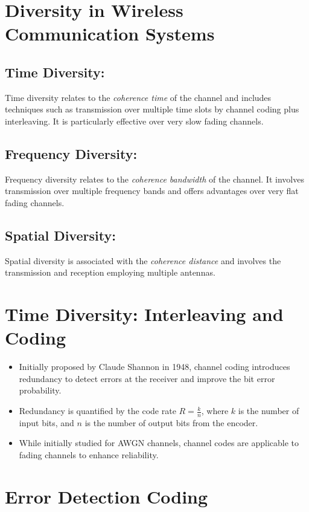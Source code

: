 \section*{Diversity in Wireless Communication Systems}

\subsection*{Time Diversity:}
Time diversity relates to the \textit{coherence time} of the channel and includes techniques such as transmission over multiple time slots by channel coding plus interleaving. It is particularly effective over very slow fading channels.

\subsection*{Frequency Diversity:}
Frequency diversity relates to the \textit{coherence bandwidth} of the channel. It involves transmission over multiple frequency bands and offers advantages over very flat fading channels.

\subsection*{Spatial Diversity:}
Spatial diversity is associated with the \textit{coherence distance} and involves the transmission and reception employing multiple antennas.

\section*{Time Diversity: Interleaving and Coding}
\begin{itemize}
    \item Initially proposed by Claude Shannon in 1948, channel coding introduces redundancy to detect errors at the receiver and improve the bit error probability.
    \item Redundancy is quantified by the code rate $R = \frac{k}{n}$, where $k$ is the number of input bits, and $n$ is the number of output bits from the encoder.
    \item While initially studied for AWGN channels, channel codes are applicable to fading channels to enhance reliability.
\end{itemize}



\section*{Error Detection Coding}

